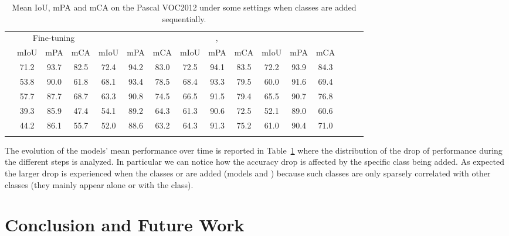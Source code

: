 \documentclass[10pt,twocolumn,letterpaper]{article}
\begin{document}
\begin{table}[]
{
\footnotesize
 \vspace{0.1cm} 
\setlength{\tabcolsep}{0.58pt}
\centering
\begin{tabular}{l|c|c|c||c|c|c||c|c|c||c|c|c|c|c|c|}
\multicolumn{1}{c}{} & \multicolumn{3}{c}{Fine-tuning} & \multicolumn{3}{c}{} & \multicolumn{3}{c}{, } &
\multicolumn{3}{c}{}  \vspace{0.045cm} \\ \hhline{~|---||---||---||---|}  \vspace{-0.045cm} & \scriptsize mIoU    & \scriptsize mPA   & \scriptsize mCA   & \scriptsize mIoU    & \scriptsize mPA   & \scriptsize mCA   & \scriptsize mIoU   & \scriptsize mPA   & \scriptsize  mCA  & 
\scriptsize mIoU   & \scriptsize mPA   & \scriptsize mCA  \\
   \hhline{~|---||---||---||---|}
 & 71.2 & 93.7 & 82.5 & 72.4 & 94.2 & 83.0 & 72.5 & 94.1 & 83.5 & 
72.2 & 93.9 & 84.3 \\
  &  53.8 & 90.0 & 61.8 & 68.1 & 93.4 & 78.5 & 68.4 & 93.3 & 79.5 & 
60.0 & 91.6 & 69.4 \\
 & 57.7 & 87.7 & 68.7 & 63.3 & 90.8 & 74.5 & 66.5 & 91.5 & 79.4 & 
65.5 & 90.7 & 76.8 \\
 &  39.3 & 85.9 & 47.4 & 54.1 & 89.2 & 64.3 & 61.3 & 90.6 & 72.5 & 
52.1 & 89.0 & 60.6 \\
&  44.2 & 86.1 & 55.7 & 52.0 & 88.6 & 63.2 & 64.3 & 91.3 & 75.2 & 
61.0 & 90.4 & 71.0 \\
 \hhline{~|---||---||---||---|}
\end{tabular}
}
\caption{Mean IoU, mPA and mCA on the Pascal VOC2012 under some settings when  classes are added sequentially.}
\label{tab:pascal_0_15_16_17_18_19_20_methods_vs_steps}
 \vspace{-0.2cm} 
\end{table}

The evolution of the models' mean performance over time is reported in Table~\ref{tab:pascal_0_15_16_17_18_19_20_methods_vs_steps} where the distribution of the drop of performance during the different steps is analyzed. In particular we can notice how the accuracy drop is affected by the specific class being added. As expected the larger drop is experienced when the classes  or  are added (models  and ) because such classes are only sparsely correlated with  other classes (they mainly appear alone or with the  class). 



 \section{Conclusion and Future Work}
\label{sec:conclusion}
\end{document}
